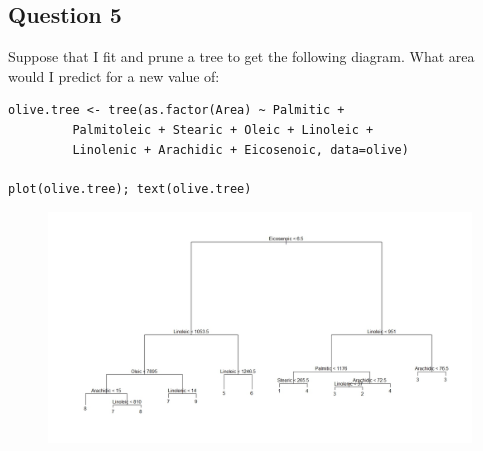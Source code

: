\documentclass[caret-main.tex]{subfiles}
\begin{document}
\subsection*{Question 5}
Suppose that I fit and prune a tree to get the following diagram. What area
would I predict for a new value of:
\begin{framed}
\begin{verbatim}
olive.tree <- tree(as.factor(Area) ~ Palmitic + 
         Palmitoleic + Stearic + Oleic + Linoleic + 
         Linolenic + Arachidic + Eicosenoic, data=olive)

plot(olive.tree); text(olive.tree)
\end{verbatim}
\end{framed}
\begin{figure}[h!]
\centering
\includegraphics[width=1.19\linewidth]{./DAquiz6q5a}
\caption{}
\label{fig:DAquiz6q5a}
\end{figure}

\end{document}
